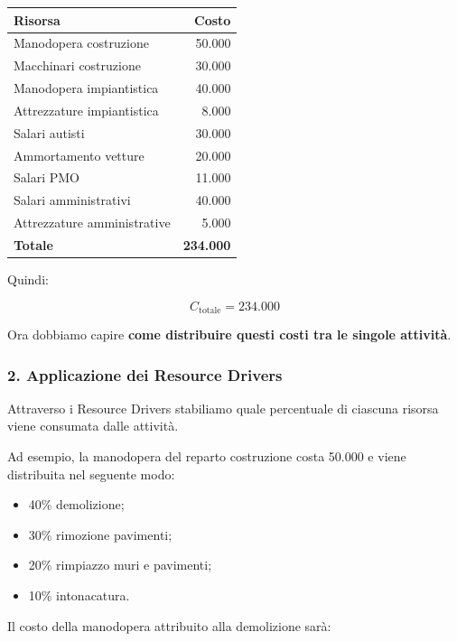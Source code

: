 \begin{center}
\begin{tabular}{|l|r|}
\hline
\textbf{Risorsa} & \textbf{Costo} \\
\hline
Manodopera costruzione & 50.000 \\
\hline
Macchinari costruzione & 30.000 \\
\hline
Manodopera impiantistica & 40.000 \\
\hline
Attrezzature impiantistica & 8.000 \\
\hline
Salari autisti & 30.000 \\
\hline
Ammortamento vetture & 20.000 \\
\hline
Salari PMO & 11.000 \\
\hline
Salari amministrativi & 40.000 \\
\hline
Attrezzature amministrative & 5.000 \\
\hline
\textbf{Totale} & \textbf{234.000} \\
\hline
\end{tabular}
\end{center}

\noindent Quindi:

\[
\boxed{C_{\text{totale}}=234.000}
\]

\noindent Ora dobbiamo capire
\textbf{come distribuire questi costi
tra le singole attività}.

\subsubsection*{2. Applicazione dei Resource Drivers}

\noindent Attraverso i Resource Drivers
stabiliamo quale percentuale di ciascuna
risorsa viene consumata dalle attività.

\medskip

\noindent Ad esempio, la manodopera
del reparto costruzione costa 50.000
e viene distribuita nel seguente modo:

\begin{itemize}
    \item 40\% demolizione;
    \item 30\% rimozione pavimenti;
    \item 20\% rimpiazzo muri e pavimenti;
    \item 10\% intonacatura.
\end{itemize}

\noindent Il costo della manodopera
attribuito alla demolizione sarà:

